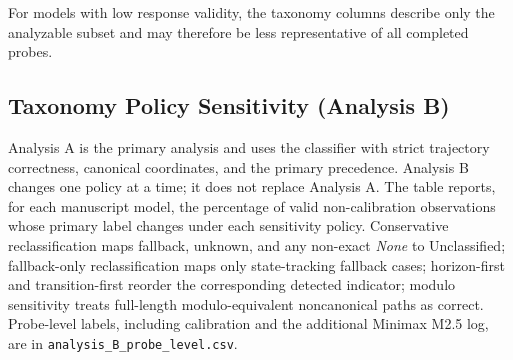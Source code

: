 \documentclass{article}
\begin{document}
For models with low response validity, the taxonomy columns describe only the analyzable subset and may therefore be less representative of all completed probes.

\subsection{Taxonomy Policy Sensitivity (Analysis B)}
\label{app:taxonomy_sensitivity}
Analysis A is the primary analysis and uses the classifier with strict trajectory correctness, canonical coordinates, and the primary precedence. Analysis B changes one policy at a time; it does not replace Analysis A. The table reports, for each manuscript model, the percentage of valid non-calibration observations whose primary label changes under each sensitivity policy. Conservative reclassification maps fallback, unknown, and any non-exact \emph{None} to Unclassified; fallback-only reclassification maps only state-tracking fallback cases; horizon-first and transition-first reorder the corresponding detected indicator; modulo sensitivity treats full-length modulo-equivalent noncanonical paths as correct. Probe-level labels, including calibration and the additional Minimax M2.5 log, are in \texttt{analysis\_B\_probe\_level.csv}.
\begin{table}[!ht]
\centering
\caption{Share of valid probes reassigned relative to Analysis A under alternative taxonomy policies.}
\label{tab:taxonomy_policy_stability}
\scriptsize
{}
\end{table}
\end{document}
